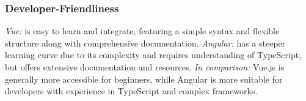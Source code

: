 


\subsubsection{Developer-Friendliness}

\textit{Vue:} is easy to learn and integrate, featuring a simple syntax and flexible structure along with comprehensive documentation.
\newline\textit{Angular:} has a steeper learning curve due to its complexity and requires understanding of TypeScript, but offers extensive documentation and resources.
\newline\textit{In comparison:} Vue.js is generally more accessible for beginners, while Angular is more suitable for developers with experience in TypeScript and complex frameworks.



